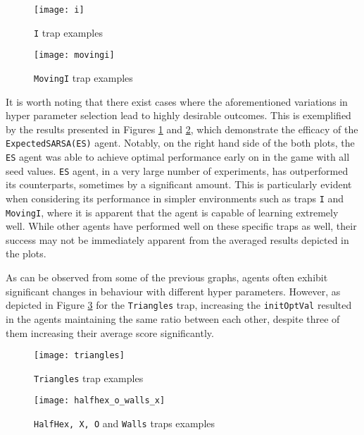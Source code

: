 \begin{figure}[h]
    \centering
    \texttt{[image: i]}
    \caption{\texttt{I} trap examples}
    \label{fig:i_eg}
\end{figure}

\begin{figure}[h]
    \centering
    \texttt{[image: movingi]}
    \caption{\texttt{MovingI} trap examples}
    \label{fig:movingi_eg}
\end{figure}


It is worth noting that there exist cases where the aforementioned variations in hyper parameter selection lead to highly desirable outcomes. This is exemplified by the results presented in Figures \ref{fig:i_eg} and \ref{fig:movingi_eg}, which demonstrate the efficacy of the \texttt{ExpectedSARSA(ES)} agent. Notably, on the right hand side of the both plots, the \texttt{ES} agent was able to achieve optimal performance early on in the game with all seed values. \texttt{ES} agent, in a very large number of experiments, has outperformed its counterparts, sometimes by a significant amount. This is particularly evident when considering its performance in simpler environments such as traps \texttt{I} and \texttt{MovingI}, where it is apparent that the agent is capable of learning extremely well. While other agents have performed well on these specific traps as well, their success may not be immediately apparent from the averaged results depicted in the plots.

As can be observed from some of the previous graphs, agents often exhibit significant changes in behaviour with different hyper parameters. However, as depicted in Figure \ref{fig:triangles_eg} for the \texttt{Triangles} trap, increasing the \texttt{initOptVal} resulted in the agents maintaining the same ratio between each other, despite three of them increasing their average score significantly.

\begin{figure}[h]
    \centering
    \texttt{[image: triangles]}
    \caption{\texttt{Triangles} trap examples}
    \label{fig:triangles_eg}
\end{figure}

\begin{figure}[h]
    \centering
    \texttt{[image: halfhex\_o\_walls\_x]}
    \caption{\texttt{HalfHex, X, O} and \texttt{Walls} traps examples}
    \label{fig:halfhex_o_walls_x_eg}
\end{figure}

